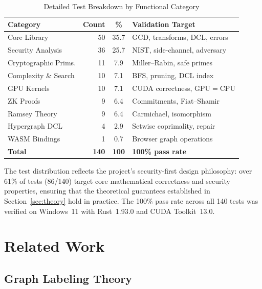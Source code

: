 \documentclass[lettersize,journal]{IEEEtran}
\begin{document}
\begin{table}[!t]
\caption{Detailed Test Breakdown by Functional Category\label{tab:test_detail}}
\centering
\begin{tabular}{@{}lrcl@{}}
\toprule
\textbf{Category} & \textbf{Count} & \textbf{\%} & \textbf{Validation Target} \\
\midrule
Core Library          & 50 & 35.7 & GCD, transforms, DCL, errors \\
Security Analysis     & 36 & 25.7 & NIST, side-channel, adversary \\
Cryptographic Prims.  & 11 &  7.9 & Miller--Rabin, safe primes \\
Complexity \& Search  & 10 &  7.1 & BFS, pruning, DCL index \\
GPU Kernels           & 10 &  7.1 & CUDA correctness, GPU$=$CPU \\
ZK Proofs             &  9 &  6.4 & Commitments, Fiat--Shamir \\
Ramsey Theory         &  9 &  6.4 & Carmichael, isomorphism \\
Hypergraph DCL        &  4 &  2.9 & Setwise coprimality, repair \\
WASM Bindings         &  1 &  0.7 & Browser graph operations \\
\midrule
\textbf{Total}        & \textbf{140} & \textbf{100} & \textbf{100\% pass rate} \\
\bottomrule
\end{tabular}
\end{table}

\noindent The test distribution reflects the project's security-first design philosophy: over 61\% of tests (86/140) target core mathematical correctness and security properties, ensuring that the theoretical guarantees established in Section~\ref{sec:theory} hold in practice. The 100\% pass rate across all 140 tests was verified on Windows~11 with Rust~1.93.0 and CUDA Toolkit~13.0.

\section{Related Work}
\label{sec:related}

\subsection{Graph Labeling Theory}
\end{document}
